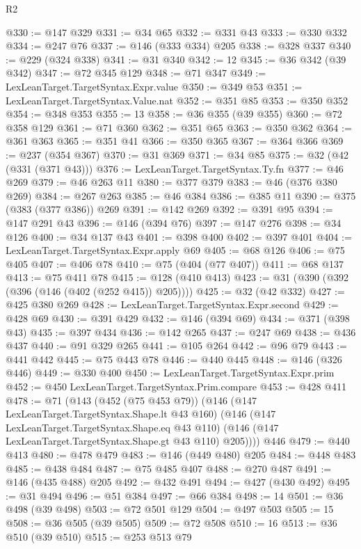 \begin{lexlean}{R2}
\begin{coremodule}
{{{{{{{{{{{{{{{{{{{{{{{{{{{{{{{{{{{{{{{{{{{@330 := @147 @329
@331 := @34 @65
@332 := @331 @43
@333 := @330 @332
@334 := @247 @76
@337 := @146 (@333 @334) @205
@338 := @328 @337
@340 := @229 (@324 @338)
@341 := @31 @340
@342 := 12
@345 := @36 @342 (@39 @342)
@347 := @72 @345 @129
@348 := @71 @347
@349 := LexLeanTarget.TargetSyntax.Expr.value
@350 := @349 @53
@351 := LexLeanTarget.TargetSyntax.Value.nat
@352 := @351 @85
@353 := @350 @352
@354 := @348 @353
@355 := 13
@358 := @36 @355 (@39 @355)
@360 := @72 @358 @129
@361 := @71 @360
@362 := @351 @65
@363 := @350 @362
@364 := @361 @363
@365 := @351 @41
@366 := @350 @365
@367 := @364 @366
@369 := @237 (@354 @367)
@370 := @31 @369
@371 := @34 @85
@375 := @32 (@42 (@331 (@371 @43)))
@376 := LexLeanTarget.TargetSyntax.Ty.fn
@377 := @46 @269
@379 := @46 @263 @11
@380 := @377 @379
@383 := @46 (@376 @380 @269)
@384 := @267 @263
@385 := @46 @384
@386 := @385 @11
@390 := @375 (@383 (@377 @386)) @269
@391 := @142 @269
@392 := @391 @95
@394 := @147 @291 @43
@396 := @146 (@394 @76)
@397 := @147 @276
@398 := @34 @126
@400 := @34 @137 @43
@401 := @398 @400
@402 := @397 @401
@404 := LexLeanTarget.TargetSyntax.Expr.apply @69
@405 := @68 @126
@406 := @75 @405
@407 := @406 @78
@410 := @75 (@404 (@77 @407))
@411 := @68 @137
@413 := @75 @411 @78
@415 := @128 (@410 @413)
@423 := @31 (@390 (@392 (@396 (@146 (@402 (@252 @415)) @205))))
@425 := @32 (@42 @332)
@427 := @425 @380 @269
@428 := LexLeanTarget.TargetSyntax.Expr.second
@429 := @428 @69
@430 := @391 @429
@432 := @146 (@394 @69)
@434 := @371 (@398 @43)
@435 := @397 @434
@436 := @142 @265
@437 := @247 @69
@438 := @436 @437
@440 := @91 @329 @265
@441 := @105 @264
@442 := @96 @79
@443 := @441 @442
@445 := @75 @443 @78
@446 := @440 @445
@448 := @146 (@326 @446)
@449 := @330 @400
@450 := LexLeanTarget.TargetSyntax.Expr.prim
@452 := @450 LexLeanTarget.TargetSyntax.Prim.compare
@453 := @428 @411
@478 := @71
    (@143
      (@452 (@75 @453 @79))
      (@146
        (@147 LexLeanTarget.TargetSyntax.Shape.lt @43 @160)
        (@146
          (@147 LexLeanTarget.TargetSyntax.Shape.eq @43 @110)
          (@146 (@147 LexLeanTarget.TargetSyntax.Shape.gt @43 @110) @205))))
    @446
@479 := @440 @413
@480 := @478 @479
@483 := @146 (@449 @480) @205
@484 := @448 @483
@485 := @438 @484
@487 := @75 @485 @407
@488 := @270 @487
@491 := @146 (@435 @488) @205
@492 := @432 @491
@494 := @427 (@430 @492)
@495 := @31 @494
@496 := @51 @384
@497 := @66 @384
@498 := 14
@501 := @36 @498 (@39 @498)
@503 := @72 @501 @129
@504 := @497 @503
@505 := 15
@508 := @36 @505 (@39 @505)
@509 := @72 @508
@510 := 16
@513 := @36 @510 (@39 @510)
@515 := @253 @513 @79
}}}}}}}}}}}}}}}}}}}}}}}}}}}}}}}}}}}}}}}}}}}
\end{coremodule}
\end{lexlean}
